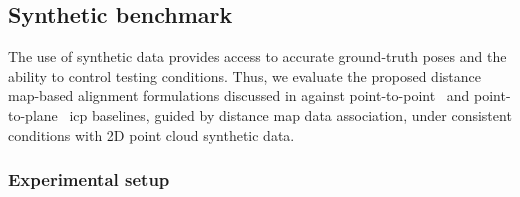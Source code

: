 \subsection{Synthetic benchmark}
\label{sec:distance-maps:results:synthetic}

The use of synthetic data provides access to accurate ground-truth poses and
the ability to control testing conditions.
Thus, we evaluate the proposed distance map-based alignment formulations
discussed in  against
point-to-point~\cite{besl-mckay:tpami:1992} and
point-to-plane~\cite{chen-medioni:icra:1991} \gls{icp} baselines,
guided by distance map data association, under consistent conditions with
2D point cloud synthetic data.

\subsubsection{Experimental setup}
\label{sec:distance-maps:results:synthetic:setup}

